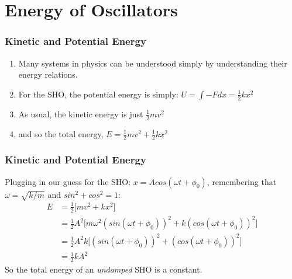 \documentclass[pdf,hideothersubsections]{beamer}
\begin{document}
\section{Energy of Oscillators}
\begin{frame}
\frametitle{Kinetic and Potential Energy}
\pause
\begin{enumerate}
\item Many systems in physics can be understood simply by
  understanding their energy relations.
\pause
\item For the SHO, the potential energy is simply: $U = \int{-F dx} =
  \frac{1}{2}k x^2$
\pause
\item As usual, the kinetic energy is just $\frac{1}{2} m v^2$
\pause
\item and so the total energy, $E =  \frac{1}{2} m v^2 + \frac{1}{2}k x^2$
\end{enumerate}

\end{frame}

\begin{frame}
\frametitle{Kinetic and Potential Energy}
Plugging in our guess for the SHO: $x = A cos(\omega t + \phi_0)$,
remembering that $\omega = \sqrt{k/m}$ and $sin^2 + cos^2 = 1$:
\begin{align*}
E  &= \frac{1}{2} \Big[ m v^2 + k x^2 \Big]             \\
   &= \frac{1}{2} A^2 \Big[m \omega^2 (sin(\omega t + \phi_0))^2 + k (cos(\omega t + \phi_0))^2 \Big]   \\
   &= \frac{1}{2} A^2 k \Big[(sin(\omega t + \phi_0))^2 + (cos(\omega t + \phi_0))^2 \Big]   \\
   &= \frac{1}{2} k A^2
\end{align*}
So the total energy of an \emph{undamped} SHO is a constant\footnotemark.


\end{frame}



\end{document}
